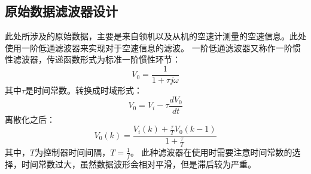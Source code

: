 \subsection{原始数据滤波器设计}
此处所涉及的原始数据，主要是来自领机以及从机的空速计测量的空速信息。此处使用一阶低通滤波器来实现对于空速信息的滤波。
一阶低通滤波器又称作一阶惯性滤波器，传递函数形式为标准一阶惯性环节：
\begin{equation}
    V_0=\frac{1}{1+\tau j\omega}
\end{equation}
其中$\tau$是时间常数。转换成时域形式：
\begin{equation}
    V_0=V_i -\tau\frac{dV_0}{dt}
\end{equation}
离散化之后：
\begin{equation}
    V_0(k)=\frac{V_i(k)+\frac{\tau}{T}V_0(k-1)}{1+\frac{\tau}{T}}
\end{equation}
其中，$T$为控制器时间间隔，$T=\frac{1}{f}$。
此种滤波器在使用时需要注意时间常数的选择，时间常数过大，虽然数据波形会相对平滑，但是滞后较为严重。
